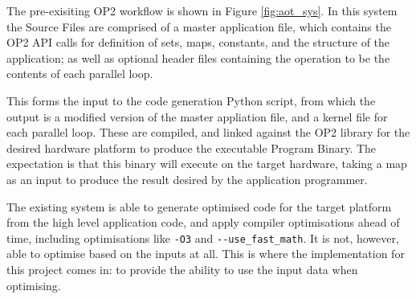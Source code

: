 The pre-exisiting OP2 workflow is shown in Figure \ref{fig:aot_sys}. In this system the Source Files are comprised of a master application file, which contains the OP2 API calls for definition of sets, maps, constants, and the structure of the application; as well as optional header files containing the operation to be the contents of each parallel loop.
\par
This forms the input to the code generation Python script, from which the output is a modified version of the master appliation file, and a kernel file for each parallel loop. These are compiled, and linked against the OP2 library for the desired hardware platform to produce the executable Program Binary. The expectation is that this binary will execute on the target hardware, taking a map as an input to produce the result desired by the application programmer.
\par
The existing system is able to generate optimised code for the target platform from the high level application code, and apply compiler optimisations ahead of time, including optimisations like \verb|-O3| and \verb|--use_fast_math|. It is not, however, able to optimise based on the inputs at all. This is where the implementation for this project comes in: to provide the ability to use the input data when optimising.
\vspace{-1.5cm}

